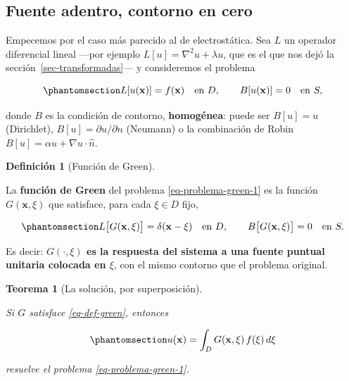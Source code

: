 \documentclass[
  spanish,
  a4paper,
]{scrbook}
\theoremstyle{definition}
\newtheorem{definition}{Definición}[chapter]
\theoremstyle{plain}
\theoremstyle{definition}
\theoremstyle{plain}
\newtheorem{theorem}{Teorema}[chapter]
\theoremstyle{definition}
\theoremstyle{remark}
\begin{document}
\subsection{Fuente adentro, contorno en cero}\label{sec-green-caso-1}

Empecemos por el caso más parecido al de electrostática. Sea \(L\) un
operador diferencial lineal ---por ejemplo
\(L[u] = \nabla^2u + \lambda u\), que es el que nos dejó la
sección~\ref{sec-transformadas}--- y consideremos el problema

\begin{equation}\protect\phantomsection\label{eq-problema-green-1}{
L[u(\mathbf{x})] = f(\mathbf{x}) \quad \text{en } D, \qquad
B[u(\mathbf{x})] = 0 \quad \text{en } S ,
}\end{equation}

donde \(B\) es la condición de contorno, \textbf{homogénea}: puede ser
\(B[u]=u\) (Dirichlet), \(B[u] = \partial u/\partial n\) (Neumann) o la
combinación de Robin \(B[u] = \alpha u + \nabla u\cdot\hat n\).

\begin{definition}[Función de
Green]\protect\hypertarget{def-green-varias}{}\label{def-green-varias}

La \textbf{función de Green} del problema \ref{eq-problema-green-1} es
la función \(G(\mathbf{x},\xi)\) que satisface, para cada \(\xi \in D\)
fijo,

\begin{equation}\protect\phantomsection\label{eq-def-green}{
L\big[G(\mathbf{x},\xi)\big] = \delta(\mathbf{x}-\xi) \quad\text{en } D, \qquad
B\big[G(\mathbf{x},\xi)\big] = 0 \quad\text{en } S .
}\end{equation}

Es decir: \textbf{\(G(\cdot,\xi)\) es la respuesta del sistema a una
fuente puntual unitaria colocada en \(\xi\)}, con el mismo contorno que
el problema original.

\end{definition}

\begin{theorem}[La solución, por
superposición]\protect\hypertarget{thm-green-varias}{}\label{thm-green-varias}

Si \(G\) satisface \ref{eq-def-green}, entonces

\begin{equation}\protect\phantomsection\label{eq-solucion-green}{
u(\mathbf{x}) = \int_D G(\mathbf{x},\xi)\,f(\xi)\,d\xi
}\end{equation}

resuelve el problema \ref{eq-problema-green-1}.

\end{theorem}
\end{document}
